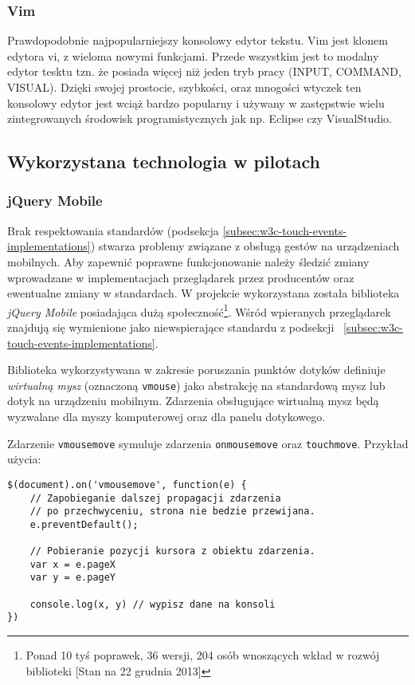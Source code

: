 \subsubsection{Vim}
\label{sub:Vim}
Prawdopodobnie najpopularniejszy konsolowy edytor tekstu. Vim jest klonem edytora vi, z wieloma nowymi funkcjami. Przede wszystkim jest to modalny edytor tesktu tzn. że posiada więcej niż jeden tryb pracy (INPUT, COMMAND, VISUAL). Dzięki swojej prostocie, szybkości, oraz mnogości wtyczek ten konsolowy edytor jest wciąż bardzo popularny i używany w zastępstwie wielu zintegrowanych środowisk programistycznych jak np. Eclipse czy VisualStudio.  

\subsection{Wykorzystana technologia w pilotach}

\subsubsection{jQuery Mobile}
\label{subsub:tool-jquery-mobile}

Brak respektowania standardów (podsekcja \ref{subsec:w3c-touch-events-implementations}) stwarza problemy związane z obsługą gestów na urządzeniach mobilnych. Aby zapewnić poprawne funkcjonowanie należy śledzić zmiany wprowadzane w implementacjach przeglądarek przez producentów oraz ewentualne zmiany w standardach. W projekcie wykorzystana została biblioteka \emph{jQuery Mobile} posiadająca dużą społeczność\footnote{Ponad 10 tyś poprawek, 36 wersji, 204 osób wnoszących wkład w rozwój biblioteki [Stan na 22 grudnia 2013]}. Wśród wpieranych przeglądarek znajdują się wymienione jako niewspierające standardu z podsekcji ~\ref{subsec:w3c-touch-events-implementations}.

Biblioteka wykorzystywana w zakresie poruszania punktów dotyków definiuje \emph{wirtualną mysz} (oznaczoną \lstinline{vmouse}) jako abstrakcję na standardową mysz lub dotyk na urządzeniu mobilnym. Zdarzenia obsługujące wirtualną mysz będą wyzwalane dla myszy komputerowej oraz dla panelu dotykowego.

Zdarzenie \lstinline{vmousemove} symuluje zdarzenia \lstinline{onmousemove} oraz \lstinline{touchmove}. Przykład użycia:

\lstset{language=JavaScript}
\begin{lstlisting}
$(document).on('vmousemove', function(e) {
	// Zapobieganie dalszej propagacji zdarzenia
	// po przechwyceniu, strona nie bedzie przewijana.
	e.preventDefault();
	
	// Pobieranie pozycji kursora z obiektu zdarzenia.
	var x = e.pageX
	var y = e.pageY
	
	console.log(x, y) // wypisz dane na konsoli
})
\end{lstlisting}

